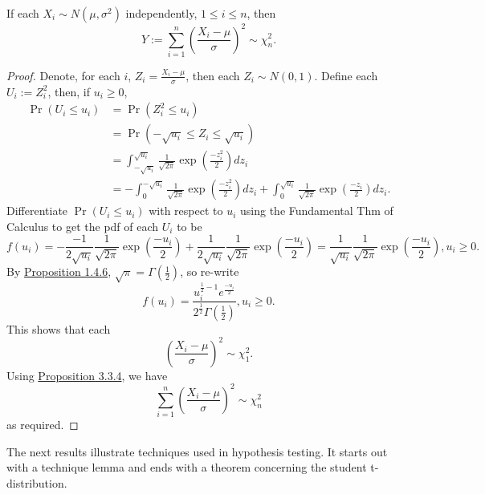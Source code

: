 \documentclass[11pt,fleqn]{book} %
\begin{document}
\begin{proposition} \label{prop:335}
If each \(X_i \sim N(\mu, \sigma^2)\) independently, \(1 \leq i \leq n\), then
\[
Y := \sum_{i=1}^n \left(\frac{X_i - \mu}{\sigma}\right)^2 \sim \chi^2_n.
\]
\end{proposition}
\begin{proof}
Denote, for each \(i\), \(Z_i = \frac{X_i - \mu}{\sigma}\), then each \(Z_i \sim N(0, 1)\). Define each \(U_i := Z_i^2\), then, if \(u_i \geq 0\),
\[
\begin{aligned}
\Pr(U_i \leq u_i) &= \Pr(Z_i^2 \leq u_i) \\
&= \Pr(-\sqrt{u_i} \leq Z_i \leq \sqrt{u_i}) \\
&= \int_{-\sqrt{u_i}}^{\sqrt{u_i}} \frac{1}{\sqrt{2\pi}}\exp\left(\frac{-z_i^2}{2}\right) dz_i \\
&= -\int_0^{-\sqrt{u_i}} \frac{1}{\sqrt{2\pi}}\exp\left(\frac{-z_i^2}{2}\right) dz_i + \int_0^{\sqrt{u_i}} \frac{1}{\sqrt{2\pi}} \exp\left(\frac{-z_i}{2}\right)dz_i.
\end{aligned}
\]
\indent Differentiate \(\Pr(U_i \leq u_i)\) with respect to \(u_i\) using the Fundamental Thm of Calculus to get the pdf of each \(U_i\) to be
\[
f(u_i) = -\frac{-1}{2\sqrt{u_i}}\frac{1}{\sqrt{2\pi}}\exp\left(\frac{-u_i}{2}\right) + \frac{1}{2\sqrt{u_i}}\frac{1}{\sqrt{2\pi}}\exp\left(\frac{-u_i}{2}\right) = \frac{1}{\sqrt{u_i}}\frac{1}{\sqrt{2\pi}}\exp\left(\frac{-u_i}{2}\right), u_i \geq 0.
\]
\indent By \hyperref[prop:146]{Proposition 1.4.6}, \(\sqrt{\pi} = \Gamma\left(\frac12\right)\), so re-write
\[
f(u_i) = \frac{u_i^{\frac12 - 1}e^{\frac{-u_i}{2}}}{2^{\frac12}\Gamma\left(\frac12\right)}, u_i \geq 0.
\]
\indent This shows that each
\[
\left(\frac{X_i - \mu}{\sigma}\right)^2 \sim \chi_1^2.
\]
\indent Using \hyperref[prop:334]{Proposition 3.3.4}, we have
\[
\sum_{i=1}^n\left(\frac{X_i - \mu}{\sigma}\right)^2 \sim \chi_n^2
\]
as required.
\end{proof}

\begin{remark} \label{rmk:336}
The next results illustrate techniques used in hypothesis testing. It starts out with a technique lemma and ends with a theorem concerning the student t-distribution.
\end{remark}
\end{document}
